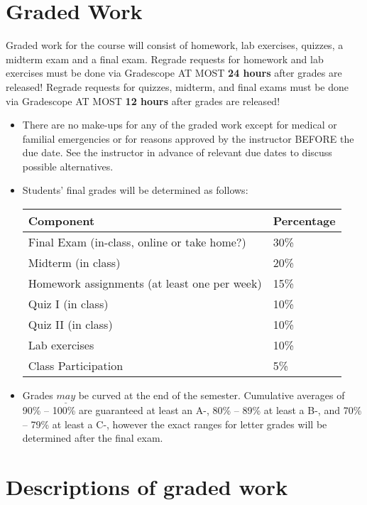 \documentclass[11pt, a4paper]{article}
\begin{document}
\section{Graded Work} 
Graded work for the course will consist of homework, lab exercises, quizzes, a midterm exam and a final exam. Regrade requests for homework and lab exercises must be done via Gradescope AT MOST \textbf{24 hours} after grades are released! Regrade requests for quizzes, midterm, and final exams must be done via Gradescope AT MOST \textbf{12 hours} after grades are released!
\begin{itemize}[label= {\color{darkblue}{\ArrowBoldRightStrobe}}]
	\item There are no make-ups for any of the graded work except for medical or familial emergencies or for reasons approved by the instructor BEFORE the due date. See the instructor in advance of relevant due dates to discuss possible alternatives. 
	
	\item Students' final grades will be determined as follows:
	\begin{table}[h]
		\centering
		\begin{tabular}{ll}
			Component & Percentage \\ 
			\hline
			Final Exam (in-class, online or take home?) & 30\% \\ 
			Midterm (in class) & 20\% \\
			Homework assignments (at least one per week) & 15\% \\
			Quiz I (in class) & 10\% \\
			Quiz II (in class) & 10\% \\
			Lab exercises & 10\% \\
			Class Participation & 5\% \\
			\hline 
		\end{tabular}
	\end{table}

	\item Grades $\underline{may}$ be curved at the end of the semester. Cumulative averages of 90\% -- 100\% are guaranteed at least an A-, 80\% -- 89\% at least a B-, and 70\% -- 79\% at least a C-, however the exact ranges for letter grades will be determined after the final exam. 
\end{itemize}


\section{Descriptions of graded work}
\end{document}
